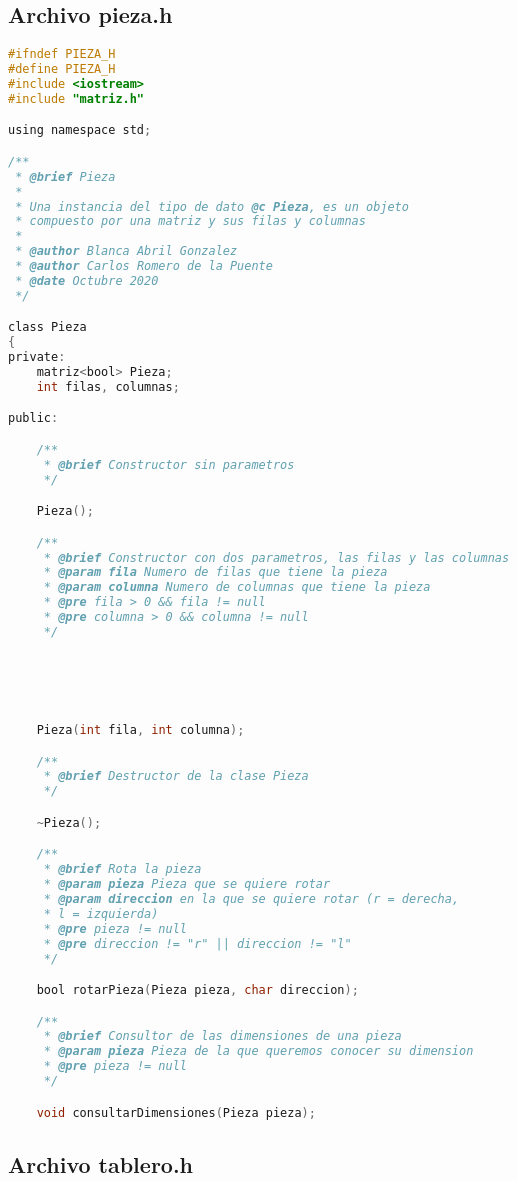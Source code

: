 \documentclass[12pt, spanish]{article}
\begin{document}
\pagebreak

\subsection{Archivo pieza.h }
\begin{lstlisting}[language=C]
#ifndef PIEZA_H
#define PIEZA_H
#include <iostream>
#include "matriz.h"

using namespace std;

/**
 * @brief Pieza
 *
 * Una instancia del tipo de dato @c Pieza, es un objeto
 * compuesto por una matriz y sus filas y columnas  
 *
 * @author Blanca Abril Gonzalez
 * @author Carlos Romero de la Puente
 * @date Octubre 2020
 */

class Pieza
{
private:
	matriz<bool> Pieza;
	int filas, columnas;

public:

	/**
	 * @brief Constructor sin parametros
	 */

	Pieza();

	/**
	 * @brief Constructor con dos parametros, las filas y las columnas
	 * @param fila Numero de filas que tiene la pieza
	 * @param columna Numero de columnas que tiene la pieza
	 * @pre fila > 0 && fila != null
	 * @pre columna > 0 && columna != null
	 */





	Pieza(int fila, int columna);

	/**
	 * @brief Destructor de la clase Pieza
	 */

	~Pieza();

	/**
	 * @brief Rota la pieza
	 * @param pieza Pieza que se quiere rotar
	 * @param direccion en la que se quiere rotar (r = derecha,
	 * l = izquierda)
	 * @pre pieza != null
	 * @pre direccion != "r" || direccion != "l"
	 */

	bool rotarPieza(Pieza pieza, char direccion);

	/**
	 * @brief Consultor de las dimensiones de una pieza
	 * @param pieza Pieza de la que queremos conocer su dimension
	 * @pre pieza != null
	 */

	void consultarDimensiones(Pieza pieza);

\end{lstlisting}

\pagebreak

\subsection{Archivo tablero.h}
\end{document}
